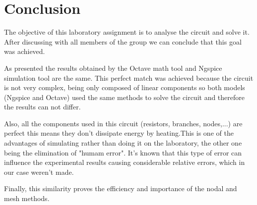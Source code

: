 \newpage
\section{Conclusion}
\label{sec:conclusion}


The objective of this laboratory assignment is to analyse the circuit and solve it. After discussing with all members of the group we can conclude that this goal was achieved.

As presented the results obtained by the Octave math tool and Ngspice simulation tool are the same. This perfect match was achieved because the circuit is not very complex, being only composed of linear components so both models (Ngspice and Octave) used the same methods to solve the circuit and therefore the results can not differ.

Also, all the components used in this circuit (resistors, branches, nodes,...) are perfect this means they don't dissipate energy by heating.This is one of the advantages of simulating rather than doing it on the laboratory, the other one being the elimination of "humam error". It's known that this type of error can influence the experimental results causing considerable relative errors, which in our case weren't made.

Finally, this similarity proves the efficiency and importance of the nodal and mesh methods.



